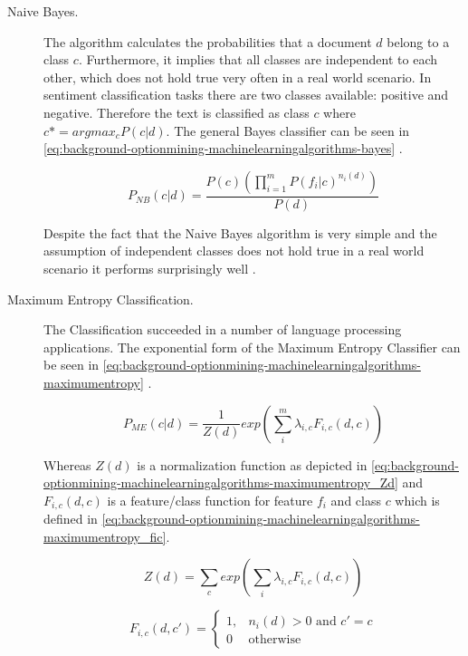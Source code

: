 \begin{description}
	\item[Naive Bayes.] 
    The \nb{} algorithm calculates the probabilities that a document $d$ belong to a class $c$.
	Furthermore, it implies that all classes are independent to each other, which does not hold true very often in a real world scenario.
	In sentiment classification tasks there are two classes available: positive and negative.
	Therefore the text is classified as class $c$ where $c* = arg max_c P(c | d)$.
	The general Bayes classifier can be seen in \autoref{eq:background-optionmining-machinelearningalgorithms-bayes} \citep{Pang2002}.
	
	\begin{equation}
		P_{NB}(c|d) = \frac{P(c) (\prod_{i=1}^{m} P(f_i|c)^{n_i(d)}) }{P(d)}
		\label{eq:background-optionmining-machinelearningalgorithms-bayes}
	\end{equation}
	
	Despite the fact that the Naive Bayes algorithm is very simple and the assumption of independent classes does not hold true in a real world scenario it performs surprisingly well \citep{Pang2002}.
	
	\item[Maximum Entropy Classification.]
	The \me{} Classification succeeded in a number of language processing applications.
	The exponential form of the Maximum Entropy Classifier can be seen in \autoref{eq:background-optionmining-machinelearningalgorithms-maximumentropy} \citep{Pang2002}.
	
	\begin{equation}
		P_{ME}(c|d) = \frac{1}{Z(d)} exp \left( \sum_i^m \lambda_{i,c}F_{i,c}(d,c) \right)
		\label{eq:background-optionmining-machinelearningalgorithms-maximumentropy}
	\end{equation}
	
	Whereas $Z(d)$ is a normalization function as depicted in \autoref{eq:background-optionmining-machinelearningalgorithms-maximumentropy_Zd} \citep{Nigam1999} and $F_{i,c}(d,c)$ is a feature/class function for feature $f_i$ and class $c$ which is defined in \autoref{eq:background-optionmining-machinelearningalgorithms-maximumentropy_fic}.

	\begin{equation}
		Z(d) = \sum_c exp(\sum_i \lambda_{i,c} F_{i,c}(d,c))
		\label{eq:background-optionmining-machinelearningalgorithms-maximumentropy_Zd}
	\end{equation}

	\begin{equation}
	F_{i,c}(d,c') = 
		\begin{cases}
		1, & n_i(d) > 0 \text{ and } c' = c \\
		0  & \text{otherwise}
		\end{cases}
		\label{eq:background-optionmining-machinelearningalgorithms-maximumentropy_fic}
	\end{equation}


\end{description}
